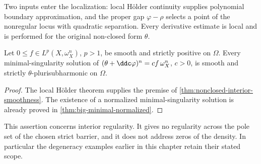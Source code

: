 \begin{remark}\label{rem:interior-local-nature}
Two inputs enter the localization: local H\"older continuity supplies polynomial boundary approximation, and the proper gap $\varphi-\rho$ selects a point of the nonregular locus with quadratic separation. Every derivative estimate is local and is performed for the original non-closed form $\theta$.
\end{remark}


\begin{corollary}\label{cor:big-lp-interior-smoothness}
Let $0\leq f\in L^p(X,\omega_X^n)$, $p>1$, be smooth and strictly positive
on $\Omega$. Every minimal-singularity solution of
$(\theta+\ddc\varphi)^n=cf\,\omega_X^n$, $c>0$, is smooth and strictly
$\theta$-plurisubharmonic on $\Omega$.
\end{corollary}
\begin{proof}
The local H\"older theorem \cite[Theorem~A]{Dang26} supplies the premise
of \cref{thm:nonclosed-interior-smoothness}. The existence of a normalized minimal-singularity
solution is already proved in \cref{thm:big-minimal-normalized}.
\end{proof}

This assertion concerns interior regularity. It gives no regularity
across the pole set of the chosen strict barrier, and it does not address
zeros of the density. In particular the degeneracy examples earlier in
this chapter retain their stated scope.
